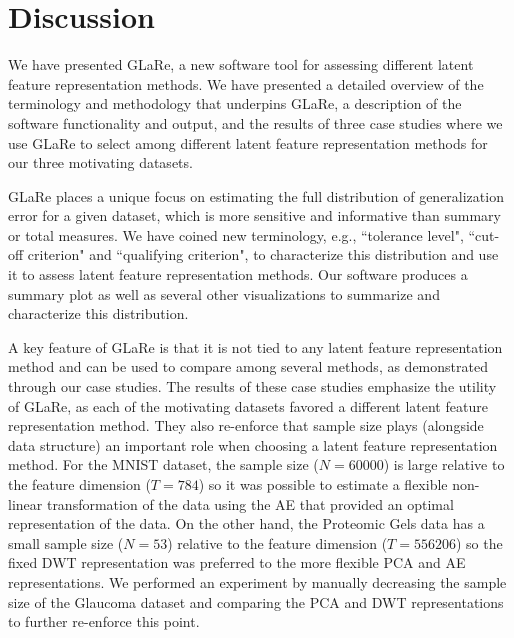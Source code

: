 \section{Discussion}\label{sec:discussion}

We have presented GLaRe, a new software tool for assessing different latent feature representation methods.
We have presented a detailed overview of the terminology and methodology that underpins GLaRe, a description of the software functionality and output, and the results of three case studies where we use GLaRe to select among different latent feature representation methods for our three motivating datasets.

GLaRe places a unique focus on estimating the full distribution of generalization error for a given dataset, which is more sensitive and informative than summary or total measures.
We have coined new terminology, e.g., ``tolerance level", ``cut-off criterion" and ``qualifying criterion", to characterize this distribution and use it to assess latent feature representation methods.
Our software produces a summary plot as well as several other visualizations to summarize and characterize this distribution.

A key feature of GLaRe is that it is not tied to any latent feature representation method and can be used to compare among several methods, as demonstrated through our case studies.
The results of these case studies emphasize the utility of GLaRe, as each of the motivating datasets favored a different latent feature representation method.
They also re-enforce that sample size plays (alongside data structure) an important role when choosing a latent feature representation method.
For the MNIST dataset, the sample size ($N=60000$) is large relative to the feature dimension ($T=784$) so it was possible to estimate a flexible non-linear transformation of the data using the AE that provided an optimal representation of the data.
On the other hand, the Proteomic Gels data has a small sample size ($N=53$) relative to the feature dimension ($T=556206$) so the fixed DWT representation was preferred to the more flexible PCA and AE representations.
We performed an experiment by manually decreasing the sample size of the Glaucoma dataset and comparing the PCA and DWT representations to further re-enforce this point.

